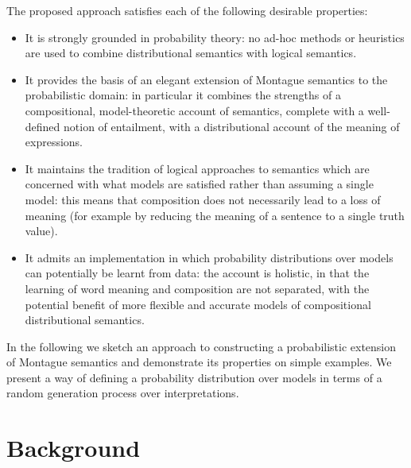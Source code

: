 \documentclass{svmult}
\begin{document}

The proposed approach satisfies each of the following desirable properties:
\begin{itemize}
\item It is strongly grounded in probability theory: no ad-hoc methods
  or heuristics are used to combine distributional semantics with
  logical semantics.
\item It provides the basis of an elegant extension of Montague
  semantics to the probabilistic domain: in particular it combines the
  strengths of a compositional, model-theoretic account of semantics,
  complete with a well-defined notion of entailment, with a
  distributional account of the meaning of expressions.
\item It maintains the tradition of logical approaches to semantics
  which are concerned with what models are satisfied rather than
  assuming a single model: this means that composition does not
  necessarily lead to a loss of meaning (for example by reducing the meaning of a
  sentence to a single truth value).
\item It admits an implementation in which probability distributions
  over models can potentially be learnt from data: the account is
  holistic, in that the learning of word meaning and composition are not
  separated, with the potential benefit of more flexible and accurate
  models of compositional distributional semantics.
\end{itemize}

In the following we sketch an approach to constructing a probabilistic
extension of Montague semantics and demonstrate its properties on
simple examples. We present a way of defining a probability
distribution over models in terms of  a random generation process over
interpretations.




\section{Background}
\end{document}

